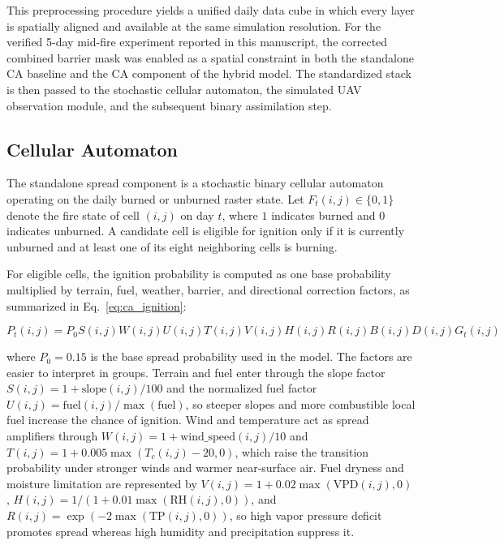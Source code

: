 \documentclass[10pt,letterpaper]{article}
\begin{document}
This preprocessing procedure yields a unified daily data cube in which
every layer is spatially aligned and available at the same simulation
resolution. For the verified 5-day mid-fire experiment reported in this
manuscript, the corrected combined barrier mask was enabled as a spatial
constraint in both the standalone CA baseline and the CA component of
the hybrid model. The standardized stack is then passed to the
stochastic cellular automaton, the simulated UAV observation module, and
the subsequent binary assimilation step.

\subsection*{Cellular Automaton}

The standalone spread component is a stochastic binary cellular
automaton operating on the daily burned or unburned raster state. Let
$F_t(i,j) \in \{0,1\}$ denote the fire state of cell $(i,j)$ on day $t$,
where $1$ indicates burned and $0$ indicates unburned. A candidate cell
is eligible for ignition only if it is currently unburned and at least
one of its eight neighboring cells is burning.

For eligible cells, the ignition probability is computed as one base
probability multiplied by terrain, fuel, weather, barrier, and
directional correction factors, as summarized in Eq.~\ref{eq:ca_ignition}:

\begin{equation}
P_t(i,j)=P_0 S(i,j) W(i,j) U(i,j) T(i,j) V(i,j) H(i,j) R(i,j) B(i,j) D(i,j) G_t(i,j)
\label{eq:ca_ignition}
\end{equation}

where $P_0=0.15$ is the base spread probability used in the model.
The factors are easier to interpret in groups. Terrain and fuel enter
through the slope factor
$S(i,j)=1+\mathrm{slope}(i,j)/100$ and the normalized fuel factor
$U(i,j)=\mathrm{fuel}(i,j)/\max(\mathrm{fuel})$, so steeper slopes and
more combustible local fuel increase the chance of ignition. Wind and
temperature act as spread amplifiers through
$W(i,j)=1+\mathrm{wind\_speed}(i,j)/10$ and
$T(i,j)=1+0.005\max(T_c(i,j)-20,0)$, which raise the transition
probability under stronger winds and warmer near-surface air. Fuel
dryness and moisture limitation are represented by
$V(i,j)=1+0.02\max(\mathrm{VPD}(i,j),0)$,
$H(i,j)=1/(1+0.01\max(\mathrm{RH}(i,j),0))$, and
$R(i,j)=\exp(-2\max(\mathrm{TP}(i,j),0))$, so high vapor pressure deficit
promotes spread whereas high humidity and precipitation suppress it.
\end{document}
